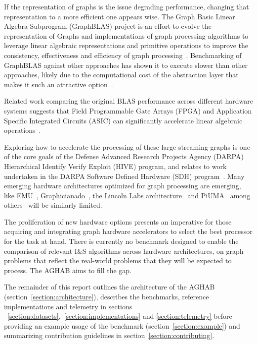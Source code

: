 \par{
    If the representation of graphs is the issue degrading performance, changing that representation to a more efficient one appears wise. 
    The Graph Basic Linear Algebra Subprogram (GraphBLAS) project is an effort to evolve the representation of Graphs and implementations of graph processing algorithms to leverage linear algebraic representations and primitive operations to improve the consistency, effectiveness and efficiency of graph processing~\cite{Mattson2013, Mattson2019, Kepner2015, Kepner2016, Brock2021}.
    Benchmarking of GraphBLAS against other approaches has shown it to execute slower than other approaches, likely due to the computational cost of the abstraction layer that makes it such an attractive option~\cite{Azad2020}.
} 

\par{
    Related work comparing the original BLAS performance across different hardware systems suggests that Field Programmable Gate Arrays (FPGA) and Application Specific Integrated Circuits (ASIC) can significantly accelerate linear algebraic operations~\cite{Kestur2010,Xiong2020}.
    }
\par{
    Exploring how to accelerate the processing of these large streaming graphs is one of the core goals of the Defense Advanced Research Projects Agency (DARPA) Hierarchical Identify Verify Exploit (HIVE) program, and relates to work undertaken in the DARPA Software Defined Hardware (SDH) program~\cite{Regli2022b}.
    Many emerging hardware architectures optimized for graph processing are emerging, like EMU~\cite{Dysart2016}, Graphicianado~\cite{Ham2016}, the Lincoln Labs architecture~\cite{Song2016} and PiUMA~\cite{Aananthakrishnan2020} among others~\cite{Peccerillo2022} will be similarly limited.
    }
\par{
    The proliferation of new hardware options presents an imperative for those acquiring and integrating graph hardware accelerators to select the best processor for the task at hand. 
    There is currently no benchmark designed to enable the comparison of relevant I\&S algorithms across hardware architectures, on graph problems that reflect the real-world problems that they will be expected to process. 
    The AGHAB aims to fill the gap. 
    }
\par{
    The remainder of this report outlines the architecture of the AGHAB (section~\ref{section:architecture}), describes the benchmarks, reference implementations and telemetry in sections ~\ref{section:datasets},~\ref{section:implementations} and \ref{section:telemetry} before providing an example usage of the benchmark (section~\ref{section:example}) and summarizing contribution guidelines in section~\ref{section:contributing}.
    }
